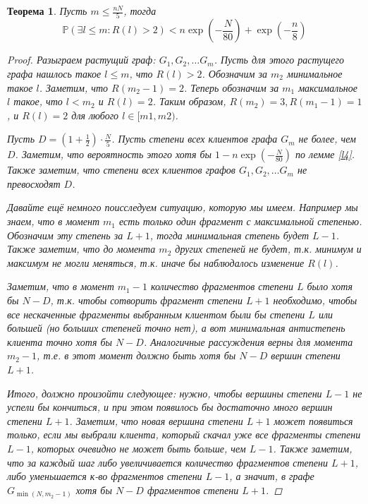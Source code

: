 \documentclass[10pt]{article}
\newcommand{\PRob}{\mathbb P}
\newcommand{\leqs}{\leqslant}
\newtheorem{theorem}{Теорема}
\theoremstyle{named}
\begin{document}
\begin{theorem}
Пусть $m \leqs \frac{nN}{5}$, тогда
\begin{equation}
\PRob\left(\exists l \leqs m : R(l) > 2 \right) < n\exp\left(-\frac{N}{80}\right) +  \exp\left(- \frac{n}{8}\right)
\end{equation}

\begin{proof}
Разыграем растущий граф: $G_1, G_2, \dots G_m$. Пусть для этого растущего графа нашлось такое $l \leqs m$, что $ R(l) > 2$.
Обозначим за $m_2$ минимальное такое $l$. Заметим, что $R(m_2 - 1) = 2$. 
Теперь обозначим за $m_1$ максимальное $l$ такое, что $l < m_2$ и $R(l) = 2$.
Таким образом, $R(m_2) = 3, R(m_1 - 1) = 1$, и $R(l) = 2$ для любого $l \in [m1, m2)$.

Пусть $D = \left(1+\frac{1}{2}\right) \cdot \frac{N}{5}$. Пусть степени всех клиентов графа $G_m$ не более, чем $D$. 
Заметим, что вероятность этого хотя бы $1 -  n\exp\left(-\frac{N}{80}\right)$ по лемме \ref{l4}.
Также заметим, что степени всех клиентов графов $G_1, G_2, \dots G_m$ не превосходят $D$.

Давайте ещё немного поисследуем ситуацию, которую мы имеем. Например мы знаем, что в момент $m_1$ есть 
только один фрагмент с максимальной степенью. Обозначим эту степень за $L + 1$, тогда минимальная степень будет $L - 1$.
Также заметим, что до момента $m_2$ других степеней не будет, т.к. минимум и максимум не могли меняться, т.к. иначе бы 
наблюдалось изменение $R(l)$. 

Заметим, что в момент $m_1 - 1$ 
количество фрагментов степени $L$ было хотя бы $N-D$, т.к. чтобы сотворить фрагмент степени $L+1$ необходимо, 
чтобы все нескаченные фрагменты выбранным клиентом были бы степени $L$ или большей (но больших степеней точно нет), а вот минимальная антистепень 
клиента точно хотя бы $N - D$. Аналогичные рассуждения верны для момента $m_2 - 1$, т.е. в этот момент должно быть хотя бы $N - D$
вершин степени $L+1$.

Итого, должно произойти следующее: нужно, чтобы вершины степени $L-1$ не успели бы кончиться, 
и при этом появилось бы достаточно много вершин степени $L + 1$. Заметим, что новая вершина степени $L+1$ может появиться только, 
если мы выбрали клиента, который скачал уже все фрагменты степени $L-1$, которых очевидно не может быть больше, чем $L-1$.
Также заметим, что за каждый шаг либо увеличивается количество фрагментов степени $L+1$, либо уменьшается к-во фрагментов степени $L-1$,
а значит, в графе $G_{\min(N, m_2 - 1)}$ хотя бы $N - D$ фрагментов степени $L+1$.


\end{proof}
\end{theorem}
\end{document}

